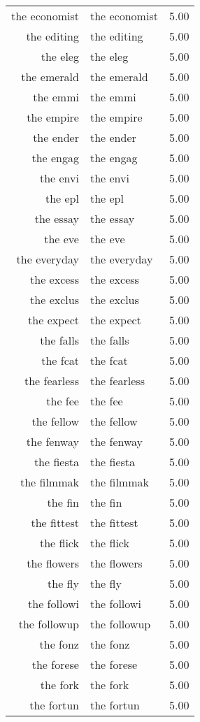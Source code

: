 \begin{table}[ht]
\begin{tabular}{rlr}
  the economist & the economist & 5.00 \\ 
  the editing & the editing & 5.00 \\ 
  the eleg & the eleg & 5.00 \\ 
  the emerald & the emerald & 5.00 \\ 
  the emmi & the emmi & 5.00 \\ 
  the empire & the empire & 5.00 \\ 
  the ender & the ender & 5.00 \\ 
  the engag & the engag & 5.00 \\ 
  the envi & the envi & 5.00 \\ 
  the epl & the epl & 5.00 \\ 
  the essay & the essay & 5.00 \\ 
  the eve & the eve & 5.00 \\ 
  the everyday & the everyday & 5.00 \\ 
  the excess & the excess & 5.00 \\ 
  the exclus & the exclus & 5.00 \\ 
  the expect & the expect & 5.00 \\ 
  the falls & the falls & 5.00 \\ 
  the fcat & the fcat & 5.00 \\ 
  the fearless & the fearless & 5.00 \\ 
  the fee & the fee & 5.00 \\ 
  the fellow & the fellow & 5.00 \\ 
  the fenway & the fenway & 5.00 \\ 
  the fiesta & the fiesta & 5.00 \\ 
  the filmmak & the filmmak & 5.00 \\ 
  the fin & the fin & 5.00 \\ 
  the fittest & the fittest & 5.00 \\ 
  the flick & the flick & 5.00 \\ 
  the flowers & the flowers & 5.00 \\ 
  the fly & the fly & 5.00 \\ 
  the followi & the followi & 5.00 \\ 
  the followup & the followup & 5.00 \\ 
  the fonz & the fonz & 5.00 \\ 
  the forese & the forese & 5.00 \\ 
  the fork & the fork & 5.00 \\ 
  the fortun & the fortun & 5.00 \\ 

\end{tabular}
\end{table}
